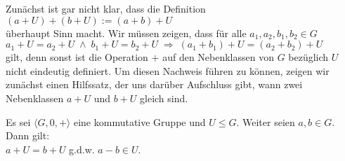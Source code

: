 \remark
Zunächst ist gar nicht klar, dass die Definition
\\[0.2cm]
\hspace*{1.3cm}
  $(a + U) + (b + U) := (a + b) + U$
\\[0.2cm]
überhaupt Sinn macht.  Wir müssen zeigen, dass für alle $a_1,a_2, b_1, b_2 \in G$
\\[0.2cm]
\hspace*{1.3cm}
$a_1 + U = a_2 + U \;\wedge\; b_1 + U = b_2 + U \;\Rightarrow\; (a_1 + b_1) + U = (a_2 + b_2) + U$
\\[0.2cm]
gilt, denn sonst ist die Operation $+$ auf den Nebenklassen von $G$ bezüglich $U$ nicht eindeutig
definiert.  Um diesen Nachweis führen zu können, zeigen wir zunächst einen Hilfssatz, der uns darüber
Aufschluss gibt, wann zwei Nebenklassen $a + U$ und $b + U$ gleich sind.
\eox
\pagebreak


\begin{Lemma}
  Es sei $\langle G, 0, + \rangle$ eine kommutative Gruppe und $U \leq G$.
  Weiter seien $a,b \in G$.  Dann gilt:
  \\[0.2cm]
  \hspace*{1.3cm}
  $a + U = b + U$ \quad g.d.w. \quad $a - b \in U$.
\end{Lemma}


